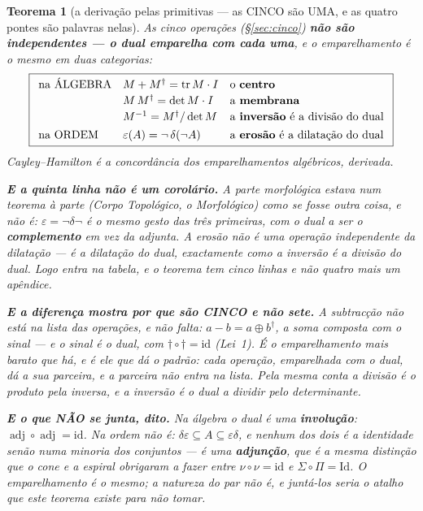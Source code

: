 \documentclass[11pt,a4paper]{article}
\newtheorem{teorema}{Teorema}
\begin{document}
\begin{teorema}[a derivação pelas primitivas --- as CINCO são UMA, e as
quatro pontes são palavras nelas]\label{thm:derivacao-primitivas}
As cinco operações (\S\ref{sec:cinco}) \textbf{não são independentes ---
o dual emparelha com cada uma}, e o emparelhamento é o mesmo \emph{em
duas categorias}:
\[
\boxed{
\begin{array}{lll}
\text{na \'ALGEBRA} &
M+M^{\dagger}=\mathrm{tr}\,M\cdot I & \text{o \textbf{centro}}\\[2pt]
& M\,M^{\dagger}=\det M\cdot I & \text{a \textbf{membrana}}\\[2pt]
& M^{-1}=M^{\dagger}/\det M & \text{a \textbf{invers\~ao} \'e a divis\~ao do dual}\\[4pt]
\text{na ORDEM} &
\varepsilon(A)=\neg\,\delta(\neg A) & \text{a \textbf{eros\~ao} \'e a dilata\c c\~ao do dual}
\end{array}}
\]
Cayley--Hamilton é a \emph{concordância} dos emparelhamentos algébricos,
derivada.

\textbf{E a quinta linha não é um corolário.} A parte morfológica estava
num teorema à parte (\emph{Corpo Topológico}, o Morfológico) como se fosse
outra coisa, e não é: $\varepsilon=\neg\delta\neg$ é o \emph{mesmo}
gesto das três primeiras, com o dual a ser o \textbf{complemento} em vez
da adjunta. A erosão não é uma operação independente da dilatação --- é a
dilatação do dual, exactamente como a inversão é a divisão do dual. Logo
entra na tabela, e o teorema tem cinco linhas e não quatro mais um
apêndice.

\textbf{E a diferença mostra por que são CINCO e não sete.} A subtracção
não está na lista das operações, e não falta: $a-b=a\oplus b^{\dagger}$,
a soma composta com o \emph{sinal} --- e o sinal é o dual, com
$\dagger\circ\dagger=\mathrm{id}$ (Lei~1). É o emparelhamento mais barato
que há, e é ele que dá o padrão: \emph{cada operação, emparelhada com o
dual, dá a sua parceira, e a parceira não entra na lista}. Pela mesma
conta a divisão é o produto pela inversa, e a inversão é o dual a dividir
pelo determinante.

\textbf{E o que NÃO se junta, dito.} Na álgebra o dual é uma
\textbf{involução}: $\operatorname{adj}\circ\operatorname{adj}
=\mathrm{id}$. Na ordem \emph{não é}: $\delta\varepsilon\subseteq A
\subseteq\varepsilon\delta$, e nenhum dos dois é a identidade senão numa
minoria dos conjuntos --- é uma \textbf{adjunção}, que é a mesma
distinção que o cone e a espiral obrigaram a fazer entre
$\nu\circ\nu=\mathrm{id}$ e $\Sigma\circ\Pi=\mathrm{Id}$. O
emparelhamento é o mesmo; a natureza do par não é, e juntá-los seria o
atalho que este teorema existe para não tomar.


\end{teorema}
\end{document}
